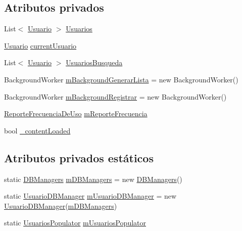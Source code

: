 \subsection*{Atributos privados}
\begin{DoxyCompactItemize}
\item 
List$<$ \hyperlink{class_proyecto___integrador__3_1_1_tipos_dato_1_1_usuario}{Usuario} $>$ \hyperlink{class_proyecto___integrador__3_1_1_main_window_aa96755d8e5d995f2a6fcc75568ad5b4d}{Usuarios}
\item 
\hyperlink{class_proyecto___integrador__3_1_1_tipos_dato_1_1_usuario}{Usuario} \hyperlink{class_proyecto___integrador__3_1_1_main_window_a14c72c878b871a5918157f933a638a6e}{current\-Usuario}
\item 
List$<$ \hyperlink{class_proyecto___integrador__3_1_1_tipos_dato_1_1_usuario}{Usuario} $>$ \hyperlink{class_proyecto___integrador__3_1_1_main_window_af1075eadedcbd62d11bd043542ea94de}{Usuarios\-Busqueda}
\item 
Background\-Worker \hyperlink{class_proyecto___integrador__3_1_1_main_window_a8c7bc6dfcff68ff1ad690fead87313b0}{m\-Background\-Generar\-Lista} = new Background\-Worker()
\item 
Background\-Worker \hyperlink{class_proyecto___integrador__3_1_1_main_window_aabcce21ca35108e6a3ab08f14883cdf2}{m\-Background\-Registrar} = new Background\-Worker()
\item 
\hyperlink{class_proyecto___integrador__3_1_1_reportes_1_1_reporte_frecuencia_de_uso}{Reporte\-Frecuencia\-De\-Uso} \hyperlink{class_proyecto___integrador__3_1_1_main_window_a6543f720f5d77939f0cc967765351416}{m\-Reporte\-Frecuencia}
\item 
bool \hyperlink{class_proyecto___integrador__3_1_1_main_window_a84896113b6d4ef07f781286dd244db94}{\-\_\-content\-Loaded}
\end{DoxyCompactItemize}
\subsection*{Atributos privados estáticos}
\begin{DoxyCompactItemize}
\item 
static \hyperlink{class_proyecto___integrador__3_1_1_d_b_managers}{D\-B\-Managers} \hyperlink{class_proyecto___integrador__3_1_1_main_window_ad2b88cf68cee145343b2da734c94d8d5}{m\-D\-B\-Managers} = new \hyperlink{class_proyecto___integrador__3_1_1_d_b_managers}{D\-B\-Managers}()
\item 
static \hyperlink{_main_window_8xaml_8cs_a411a6c16edbc411b3a0d847f13eb5b28}{Usuario\-D\-B\-Manager} \hyperlink{class_proyecto___integrador__3_1_1_main_window_a471acfe8f7066fc857cbc13023c10ad4}{m\-Usuario\-D\-B\-Manager} = new \hyperlink{_main_window_8xaml_8cs_a411a6c16edbc411b3a0d847f13eb5b28}{Usuario\-D\-B\-Manager}(\hyperlink{class_proyecto___integrador__3_1_1_main_window_ad2b88cf68cee145343b2da734c94d8d5}{m\-D\-B\-Managers})
\item 
static \hyperlink{_main_window_8xaml_8cs_a9b6fea16165d9a40204bde2f9eb53148}{Usuarios\-Populator} \hyperlink{class_proyecto___integrador__3_1_1_main_window_a3c9586e06a8edee79c1217a3985b4b68}{m\-Usuarios\-Populator}
\end{DoxyCompactItemize}


